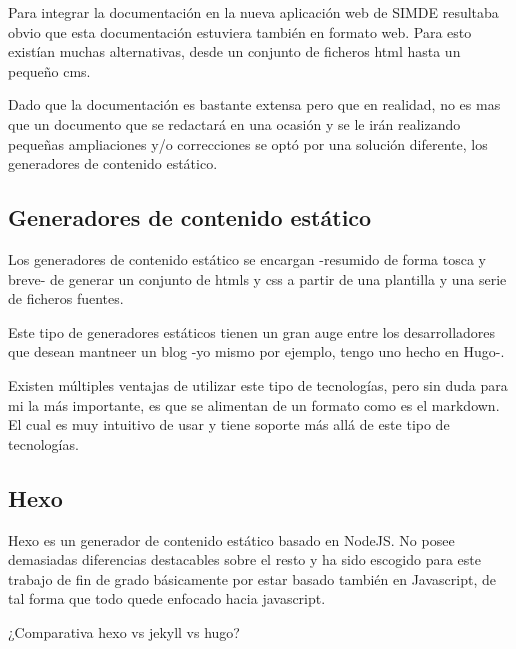 Para integrar la documentación en la nueva aplicación web de SIMDE resultaba obvio que esta documentación
estuviera también en formato web. Para esto existían muchas alternativas, desde un conjunto de ficheros
html hasta un pequeño cms. 

Dado que la documentación es bastante extensa pero que en realidad, no es mas que un documento 
que se redactará en una ocasión y se le irán realizando pequeñas ampliaciones y/o correcciones
se optó por una solución diferente, los generadores de contenido estático.

\subsection{Generadores de contenido estático}

Los generadores de contenido estático se encargan -resumido de forma tosca y breve- de generar 
un conjunto de htmls y css a partir de una plantilla y una serie de ficheros fuentes. 

\bigskip
Este tipo de generadores estáticos tienen un gran auge entre los desarrolladores que desean 
mantneer un blog -yo mismo por ejemplo, tengo uno hecho en Hugo-. 

\bigskip 
Existen múltiples ventajas de utilizar este tipo de tecnologías, pero sin duda para mi la más
importante, es que se alimentan de un formato como es el markdown. El cual es muy intuitivo de 
usar y tiene soporte más allá de este tipo de tecnologías. 

\subsection{Hexo}

Hexo es un generador de contenido estático basado en NodeJS. No posee demasiadas diferencias destacables
sobre el resto y ha sido escogido para este trabajo de fin de grado básicamente por estar basado 
también en Javascript, de tal forma que todo quede enfocado hacia javascript.

\bigskip
¿Comparativa hexo vs jekyll vs hugo?